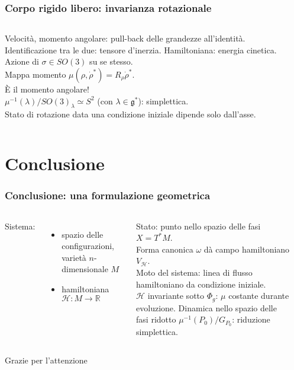 \documentclass[]{beamer}
\newcommand{\R}{\mathbb{R}}
\begin{document}
\begin{frame}
\frametitle{Corpo rigido libero: invarianza rotazionale}
\begin{columns}
  Velocità, momento angolare: pull-back delle grandezze all'identità.\\
  Identificazione tra le due: tensore d'inerzia.
  Hamiltoniana: energia cinetica.\\[11pt]
  Azione di $\sigma \in SO(3)$ su se stesso.\\
  Mappa momento $\mu(\rho, \dot{\rho}^*) = R_{\rho}\dot{\rho}^*$.\\ È il \alert{momento angolare}!\\[11pt]
  $\mu^{-1}(\lambda)/SO(3)_{\lambda} \simeq S^2$ (con $\lambda \in \mathfrak{g}^*$): simplettica.\\ 
  Stato di rotazione data una condizione iniziale dipende solo dall'asse.\\[11pt]
    \begin{center}
          
    \end{center}
\end{columns}
\end{frame}

\section{Conclusione}

\begin{frame}
\frametitle{Conclusione: una formulazione geometrica}
\begin{columns}
  Sistema: 
  \begin{itemize}
    \item {spazio delle configurazioni}, varietà $n$-dimensionale $M$
    \item {hamiltoniana} $\mathcal{H}: M\to \R$
  \end{itemize}
  {Stato}: punto nello {spazio delle fasi} $X = T^* M$.\\ 
  {Forma canonica} $\omega$ dà {campo hamiltoniano} $V_{\mathcal{H}}$.\\[5pt]
  \alert{Moto del sistema: linea di flusso hamiltoniano da condizione iniziale.}\\[5pt]
  \alert{$\mathcal{H}$ invariante sotto $\Phi_g$: $\mu$ costante durante evoluzione.} Dinamica nello spazio delle fasi ridotto $\mu^{-1}(P_0)/G_{P_0}$: riduzione simplettica. 
    \begin{center}
      
    \end{center}
\end{columns}
\end{frame}

\appendix
\begin{frame}[plain]
\hspace{0pt}
\vfill
\begin{center}
  \Huge Grazie per l'attenzione
\end{center}
\vfill
\hspace{0pt}
\end{frame}
\end{document}
